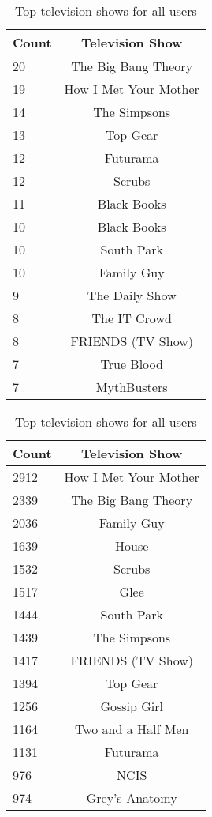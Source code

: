 \begin{table}[h]
\begin{minipage}[b]{.50\textwidth}
\centering
  \begin{tabular}{|l|c|} %
  \hline
  	\textbf{Count} & \textbf{Television Show} \\ \hline
		20 & The Big Bang Theory \\ \hline
		19 & How I Met Your Mother \\ \hline
		14 & The Simpsons \\ \hline
		13 & Top Gear \\ \hline
		12 & Futurama \\ \hline
		12 & Scrubs \\ \hline
		11 & Black Books \\ \hline
		10 & Black Books \\ \hline
		10 & South Park \\ \hline
		10 & Family Guy \\ \hline
		9 & The Daily Show \\ \hline
		8 & The IT Crowd \\ \hline
		8 & FRIENDS (TV Show) \\ \hline
		7 & True Blood \\ \hline
		7 & MythBusters \\ \hline
  \end{tabular}
  \caption{Top television shows for app users}
\end{minipage}
\begin{minipage}[b]{.50\textwidth}
\centering
  \begin{tabular}{|l|c|} %
  \hline
  		\textbf{Count} & \textbf{Television Show} \\ \hline
  		2912 & How I Met Your Mother \\ \hline
		2339 & The Big Bang Theory \\ \hline
		2036 & Family Guy \\ \hline
		1639 & House \\ \hline
		1532 & Scrubs \\ \hline
		1517 & Glee \\ \hline
		1444 & South Park \\ \hline
		1439 & The Simpsons \\ \hline
		1417 & FRIENDS (TV Show) \\ \hline
		1394 & Top Gear \\ \hline
		1256 & Gossip Girl \\ \hline
		1164 & Two and a Half Men \\ \hline
		1131 & Futurama \\ \hline
		976 & NCIS \\ \hline
		974 & Grey's Anatomy \\ \hline
  \end{tabular}
  \caption{Top television shows for all users}
\end{minipage}
\end{table}


